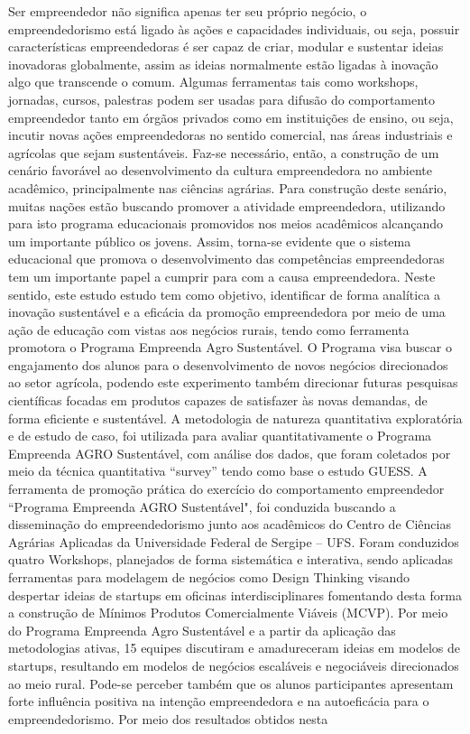 \setlength{\absparsep}{18pt} %
\begin{resumo}

Ser empreendedor não significa apenas ter seu próprio negócio, o empreendedorismo está ligado às ações e capacidades individuais, ou seja, possuir características empreendedoras é ser capaz de criar, modular e sustentar ideias inovadoras globalmente, assim as ideias normalmente estão ligadas à inovação algo que transcende o comum. Algumas ferramentas tais como workshops, jornadas, cursos, palestras podem ser usadas para difusão do comportamento empreendedor tanto em órgãos privados como em instituições de ensino, ou seja, incutir novas ações empreendedoras no sentido comercial, nas áreas industriais e agrícolas que sejam sustentáveis. Faz-se necessário, então, a construção de um cenário favorável ao desenvolvimento da cultura empreendedora no ambiente acadêmico, principalmente nas ciências agrárias. Para construção deste senário, muitas nações estão buscando promover a atividade empreendedora, utilizando para isto programa educacionais promovidos nos meios acadêmicos alcançando um importante público os jovens. Assim, torna-se evidente que o sistema educacional que promova o desenvolvimento das competências empreendedoras tem um importante papel a cumprir para com a causa empreendedora. Neste sentido, este estudo estudo tem como objetivo, identificar de forma analítica a inovação sustentável e a eficácia da promoção empreendedora por meio de uma ação de educação com vistas aos negócios rurais, tendo como ferramenta promotora o Programa Empreenda Agro Sustentável. O Programa visa buscar o engajamento dos alunos para o desenvolvimento de novos negócios direcionados ao setor agrícola, podendo este experimento também direcionar futuras pesquisas científicas focadas em produtos capazes de satisfazer às novas demandas, de forma eficiente e sustentável. A metodologia de natureza quantitativa exploratória e de estudo de caso, foi utilizada para avaliar quantitativamente o Programa Empreenda AGRO Sustentável, com análise dos dados, que foram coletados por meio da técnica quantitativa “survey” tendo como base o estudo GUESS. A ferramenta de promoção prática do exercício do comportamento empreendedor “Programa Empreenda AGRO Sustentável", foi conduzida buscando a disseminação do empreendedorismo junto aos acadêmicos do Centro de Ciências Agrárias Aplicadas da Universidade Federal de Sergipe – UFS. Foram conduzidos quatro Workshops, planejados de forma sistemática e interativa, sendo aplicadas ferramentas para modelagem de negócios como Design Thinking visando despertar ideias de startups em oficinas interdisciplinares fomentando desta forma a construção de Mínimos Produtos Comercialmente Viáveis (MCVP). Por meio do Programa Empreenda Agro Sustentável e a partir da aplicação das metodologias ativas, 15 equipes discutiram e amadureceram ideias em modelos de startups, resultando em modelos de negócios escaláveis e negociáveis direcionados ao meio rural. Pode-se perceber também que os alunos participantes apresentam forte influência positiva na intenção empreendedora e na autoeficácia para o empreendedorismo. Por meio dos resultados obtidos nesta 
\end{resumo}
